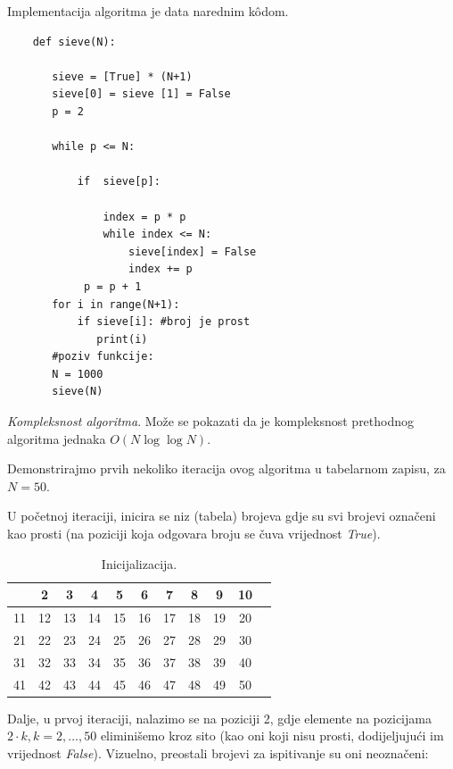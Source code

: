 Implementacija algoritma je data narednim k\^odom. 

\begin{verbatim}
	def sieve(N):
	   
	   sieve = [True] * (N+1)
	   sieve[0] = sieve [1] = False
	   p = 2
	   
	   while p <= N:
	       
	       if  sieve[p]:
	        
	           index = p * p
	           while index <= N:
	               sieve[index] = False
	               index += p   
	        p = p + 1
	   for i in range(N+1):
	       if sieve[i]: #broj je prost
	          print(i)
       #poziv funkcije:
       N = 1000
       sieve(N)
\end{verbatim}  
\textit{Kompleksnost algoritma}.  Može se pokazati da je kompleksnost pretho\-dnog algoritma jednaka $O(N \log\log N )$. 


Demonstrirajmo   prvih nekoliko iteracija ovog algoritma u tabelarnom zapisu, za $N=50.$ 

U početnoj iteraciji, inicira se niz (tabela) brojeva gdje su svi brojevi označeni kao prosti (na poziciji koja odgovara broju se čuva vrijednost \emph{True}).


\begin{table}[H]
	\centering
	\begin{tabular}{|c|c|c|c|c|c|c|c|c|c|c} \hline
       & 2 & 3 & 4 & 5 & 6 & 7 & 8 & 9 & 10 \\ \hline
    11 & 12 & 13 & 14 & 15 & 16 & 17 & 18 & 19 & 20 \\ \hline
    21 & 22 & 23 & 24 & 25 & 26 & 27 & 28 & 29 & 30 \\ \hline
    31 & 32 & 33 & 34 & 35 & 36 & 37 & 38 & 39 & 40 \\ \hline
    41 & 42 & 43 & 44 & 45 & 46 & 47 & 48 & 49 & 50 \\ \hline     
	\end{tabular}
    \caption{Inicijalizacija.} \label{eratosten-sieve-it-0}
\end{table}


Dalje, u prvoj iteraciji, nalazimo se na poziciji 2, gdje elemente na pozicijama $2 \cdot k, k=2, \ldots, 50$ eliminišemo kroz sito (kao oni koji nisu prosti, dodijeljujući im vrijednost \emph{False}). Vizuelno, preostali brojevi za ispitivanje su oni neoznačeni:



